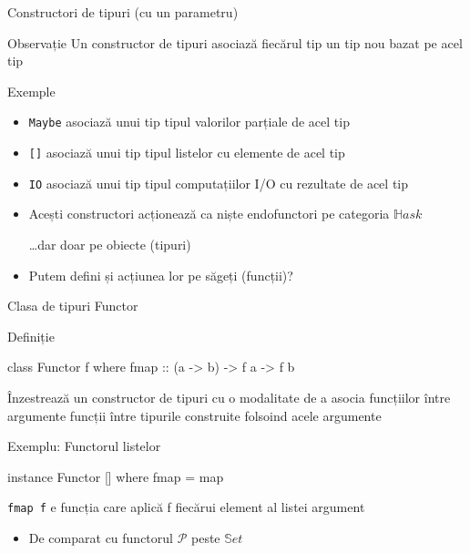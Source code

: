 \documentclass[xcolor=pdftex,romanian,colorlinks]{beamer}
\begin{document}
\begin{frame}[fragile]{Constructori de tipuri (cu un parametru)}

\begin{block}{Observație}
Un constructor de tipuri asociază fiecărul tip un tip nou bazat pe acel tip
\end{block}

\begin{block}{Exemple}
\begin{itemize}
\item \lstinline$Maybe$ asociază unui tip tipul valorilor parțiale de acel tip
\item \lstinline$[]$ asociază unui tip tipul listelor cu elemente de acel tip
\item \lstinline$IO$ asociază unui tip tipul computațiilor I/O cu rezultate de acel tip
\end{itemize}
\end{block}

\begin{itemize}
\item Acești constructori acționează ca niște endofunctori pe categoria $\mathbb{H}ask$

 \ldots dar doar pe obiecte (tipuri) 
 
\item Putem defini și acțiunea lor pe săgeți (funcții)?
\end{itemize}
\end{frame}


\begin{frame}[fragile]{Clasa de tipuri Functor}

\begin{block}{Definiție}
\vspace{-1ex}
\begin{asciihs}
class Functor f where
  fmap :: (a -> b) -> f a -> f b
\end{asciihs}
\vspace{-1ex}
Înzestrează un constructor de tipuri cu o modalitate de a asocia funcțiilor între argumente funcții între tipurile construite folsoind acele argumente
\end{block}

\begin{block}{Exemplu: Functorul listelor}
\vspace{-1ex}
\begin{asciihs}
instance Functor [] where
  fmap = map
\end{asciihs}
\vspace{-1ex}
\lstinline$fmap f$ e funcția care aplică f fiecărui element al listei argument

\begin{itemize}
\item De comparat cu functorul $\mathcal P$ peste $\mathbb{S}et$
\end{itemize}
\end{block}
\end{frame}
\end{document}
